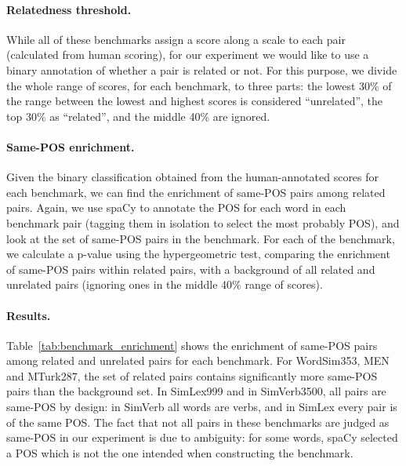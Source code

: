 \documentclass[11pt,a4paper]{article}
\begin{document}
    \paragraph{Relatedness threshold.}
    
    While all of these benchmarks assign a score along a scale to each pair
    (calculated from human scoring), for our experiment we would like to use
    a binary annotation of whether a pair is related or not.
    For this purpose, we divide the whole range of scores,
    for each benchmark, to three parts:
    the lowest 30\% of the range between the lowest and highest scores
    is considered ``unrelated'', the top 30\% as ``related'',
    and the middle 40\% are ignored.
    
    \paragraph{Same-POS enrichment.}
    
    Given the binary classification obtained from the human-annotated scores
    for each benchmark, we can find the enrichment of same-POS pairs among
    related pairs.
    Again, we use spaCy to annotate the POS for each word in each benchmark
    pair (tagging them in isolation to select the most probably POS),
    and look at the set of same-POS pairs in the benchmark.
    For each of the benchmark, we calculate a p-value using the hypergeometric
    test, comparing the enrichment of same-POS pairs within related pairs,
    with a background of all related and unrelated pairs (ignoring ones in
    the middle 40\% range of scores).
    
    \paragraph{Results.}
    
    Table~\ref{tab:benchmark_enrichment} shows the enrichment of same-POS pairs
    among related and unrelated pairs for each benchmark.
    For WordSim353, MEN and MTurk287, the set of related pairs
    contains significantly more same-POS pairs than the background set.
    In SimLex999 and in SimVerb3500, all pairs are same-POS by design:
    in SimVerb all words are verbs, and in SimLex every pair is of the same POS.
    The fact that not all pairs in these benchmarks are judged as same-POS
    in our experiment is due to ambiguity: for some words, spaCy selected a POS
    which is not the one intended when constructing the benchmark.
    
\end{document}
